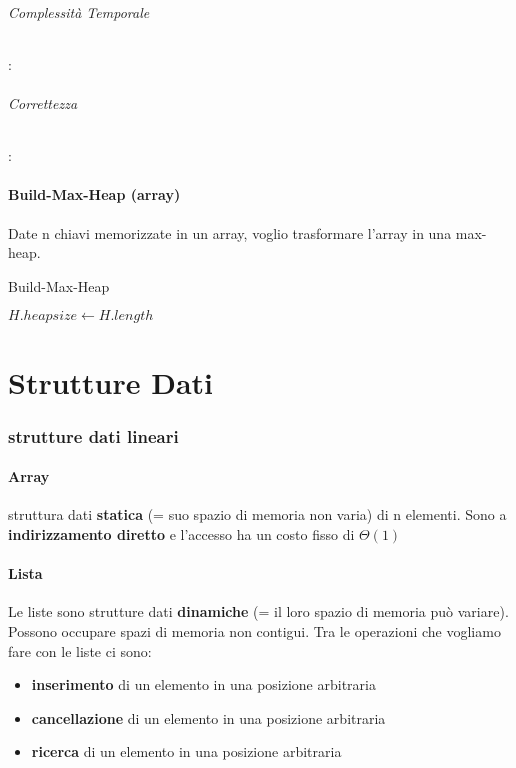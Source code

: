 \documentclass{article}
\DeclarePairedDelimiter\floor{\lfloor}{\rfloor}
\begin{document}
\paragraph{Complessità Temporale}:
\paragraph{Correttezza}:

\subsection{Build-Max-Heap (array)} %
Date n chiavi memorizzate in un array, voglio trasformare l'array in una max-heap.

\begin{algorithm}[H]
\caption{Build-Max-Heap}
$H.heapsize \leftarrow H.length$\;
\end{algorithm}



\newpage
\part{Strutture Dati}
\section{strutture dati lineari} %
\subsection{Array} %
struttura dati \textbf{statica} (= suo spazio di memoria non varia) di n elementi. 
Sono a \textbf{indirizzamento diretto} e l'accesso ha un costo fisso di $\Theta (1)$

\subsection{Lista} %
Le liste sono strutture dati \textbf{dinamiche} (= il loro spazio di memoria può variare). 
Possono occupare spazi di
 memoria non contigui. Tra le operazioni che vogliamo fare con le liste ci sono:
 \begin{itemize}
    \item \textbf{inserimento} di un elemento in una posizione arbitraria
    \item \textbf{cancellazione} di un elemento in una posizione arbitraria
    \item \textbf{ricerca} di un elemento in una posizione arbitraria
 \end{itemize}
 
\end{document}
